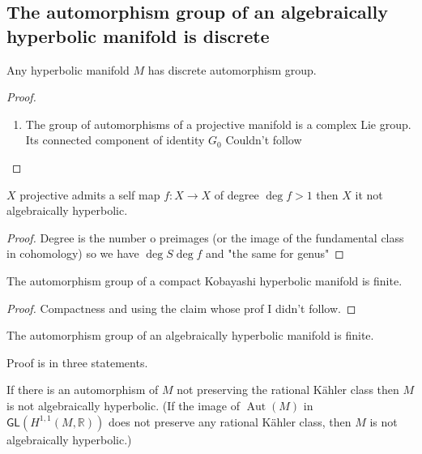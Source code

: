 \subsection{The automorphism group of an algebraically hyperbolic manifold is discrete}

\begin{claim}\leavevmode
	Any hyperbolic manifold $M$ has discrete automorphism group.
\end{claim}

\begin{proof}\leavevmode
\begin{enumerate}[label=\textbf{Step \arabic*}]
\item The group of automorphisms of a projective manifold is a complex Lie group. Its connected component of identity $G_0$ {\color{4}Couldn't follow}
\end{enumerate}
\end{proof}

\begin{thm}\leavevmode
$X$ projective admits a self map $f:X \to X$ of degree $\operatorname{deg}f>1$ then $X$ it not algebraically hyperbolic.
\end{thm}
\begin{proof}\leavevmode
Degree is the number o preimages (or the image of the fundamental class in cohomology) so we have $\operatorname{deg} S \operatorname{deg} f$ and "the same for genus"
\end{proof}

\begin{claim}\leavevmode
	The automorphism group of a compact Kobayashi hyperbolic manifold is finite.
\end{claim}

\begin{proof}\leavevmode
Compactness and using the claim whose prof I didn't follow.
\end{proof}

\begin{thm}\leavevmode
The automorphism group of an algebraically hyperbolic manifold is finite.
\end{thm}

Proof is in three statements.

\begin{prop}\leavevmode
	If there is an automorphism of $M$ not preserving the rational Kähler class then $M$ is not algebraically hyperbolic. (If the image of $\operatorname{Aut}(M)$ in $\mathsf{GL}(H^{1,1}(M,\mathbb{R}))$ does not preserve any rational Kähler class, then $M$ is not algebraically hyperbolic.)
\end{prop}

